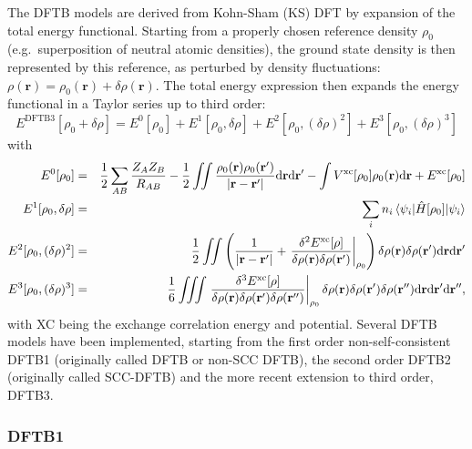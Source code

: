 \documentclass[reprint,onecolumn,superscriptaddress]{revtex4-1}
\begin{document}
The DFTB models are derived from Kohn-Sham (KS) DFT\cite{Kohn1965}
by expansion of the total energy functional.  Starting from a properly
chosen reference density $\rho_0$ (e.g.\ superposition of neutral atomic
densities), the ground state density is then represented by this reference, as 
perturbed by density fluctuations:
$\rho(\mathbf{r}) = \rho_0(\mathbf{r}) +\delta\rho(\mathbf{r})$.  The total
energy expression then expands the energy functional in a Taylor series up to third
order:
\begin{equation}
  E^{\text{DFTB3}}[\rho_0+\delta\rho] = E^0[\rho_0] + E^1[\rho_0,\delta \rho] +
  E^2[\rho_0,(\delta \rho)^2] + E^3[\rho_0,(\delta \rho)^3]
\end{equation}
with
\begin{eqnarray}
  E^0[\rho_0] &=& \frac 12 \sum_{AB} \frac{Z_AZ_B}{R_{AB}} -\frac 12 \iint
  \frac{\rho_0(\mathbf{r})\rho_0(\mathbf{r}')}{|\mathbf{r}-\mathbf{r}'|}
  \mathrm{d}\mathbf{r} \mathrm{d}\mathbf{r}' -\int
  V^{\text{xc}}[\rho_0]\rho_0(\mathbf{r})\text{d}\mathbf{r} +
  E^{\text{xc}}[\rho_0] \nonumber\\ E^1[\rho_0,\delta \rho] &=& \sum_i n_i
  \mel{\psi_i}{\hat{H}[\rho_0]}{\psi_i} \nonumber\\ E^2[\rho_0,(\delta \rho)^2]
  &=& \frac{1}{2} \iint \left( \frac{1}{|\mathbf{r}-\mathbf{r}'|} + \eval{
    \frac{\delta^2E^{\text{xc}}[\rho]}{\delta\rho(\mathbf{r})
      \delta\rho(\mathbf{r}')} }_{\rho_0} \right) \delta\rho(\mathbf{r})
  \delta\rho(\mathbf{r}') \mathrm{d}\mathbf{r} \mathrm{d}\mathbf{r}' \nonumber
  \\ E^3[\rho_0,(\delta \rho)^3] &=& \frac{1}{6} \iiint \eval{
    \frac{\delta^3E^{\text{xc}}[\rho]}{\delta\rho(\mathbf{r})
      \delta\rho(\mathbf{r}') \delta\rho(\mathbf{r}'')} }_{\rho_0}
  \delta\rho(\mathbf{r}) \delta\rho(\mathbf{r}') \delta\rho(\mathbf{r}'')
  \mathrm{d}\mathbf{r} \mathrm{d}\mathbf{r}'
  \mathrm{d}\mathbf{r}'',\label{DFTtaylor}
\end{eqnarray}
with XC being the exchange correlation energy and potential.
%
Several DFTB models have been implemented, starting from the first order
non-self-consistent DFTB1\cite{Seifert1996,Porezag1995} (originally called
DFTB or non-SCC DFTB), the second order DFTB2 (originally called SCC-DFTB)\cite{Elstner1998}
and the more recent extension to third order,
DFTB3.\cite{Elstner2007,Yang2007,Gaus2011,Gaus2012}

\subsubsection{DFTB1}
\end{document}
